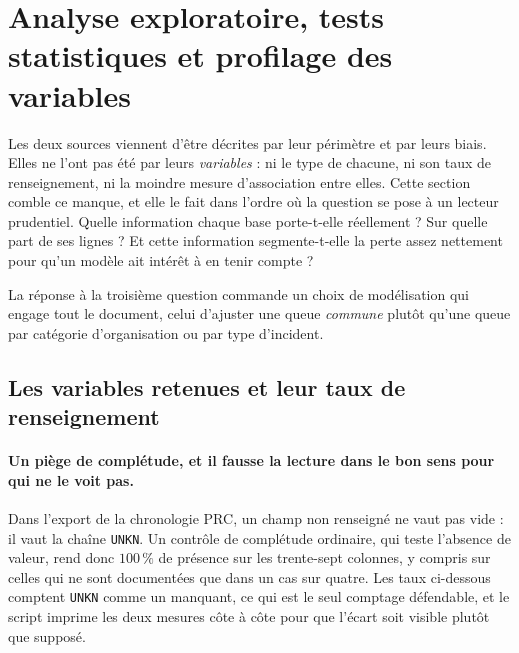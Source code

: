 


\section{Analyse exploratoire, tests statistiques et profilage des variables}
\label{sec:profilage-variables}

Les deux sources viennent d'être décrites par leur périmètre et par leurs biais. Elles ne
l'ont pas été par leurs \emph{variables} : ni le type de chacune, ni son taux de renseignement,
ni la moindre mesure d'association entre elles. Cette section comble ce manque, et elle le fait
dans l'ordre où la question se pose à un lecteur prudentiel. Quelle information chaque base
porte-t-elle réellement ? Sur quelle part de ses lignes ? Et cette information segmente-t-elle
la perte assez nettement pour qu'un modèle ait intérêt à en tenir compte ?

La réponse à la troisième question commande un choix de modélisation qui engage tout le
document, celui d'ajuster une queue \emph{commune} plutôt qu'une queue par catégorie
d'organisation ou par type d'incident.

\subsection{Les variables retenues et leur taux de renseignement}
\label{subsec:table-variables}

\paragraph{Un piège de complétude, et il fausse la lecture dans le bon sens pour qui ne le voit
pas.} Dans l'export de la chronologie PRC, un champ non renseigné ne vaut pas vide : il vaut la
chaîne \texttt{UNKN}. Un contrôle de complétude ordinaire, qui teste l'absence de valeur, rend
donc $100\,\%$ de présence sur les trente-sept colonnes, y compris sur celles qui ne sont
documentées que dans un cas sur quatre. Les taux ci-dessous comptent \texttt{UNKN} comme un
manquant, ce qui est le seul comptage défendable, et le script imprime les deux mesures côte à
côte pour que l'écart soit visible plutôt que supposé.

